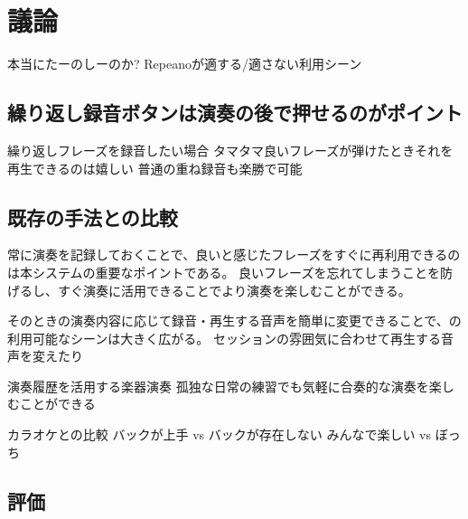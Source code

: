 \section{議論}

本当にたーのしーのか?
Repeanoが適する/適さない利用シーン

\subsection{繰り返し録音ボタンは演奏の後で押せるのがポイント}
繰り返しフレーズを録音したい場合
タマタマ良いフレーズが弾けたときそれを再生できるのは嬉しい
普通の重ね録音も楽勝で可能

\subsection{既存の手法との比較}






常に演奏を記録しておくことで、良いと感じたフレーズをすぐに再利用できるのは本システムの重要なポイントである。
良いフレーズを忘れてしまうことを防げるし、すぐ演奏に活用できることでより演奏を楽しむことができる。

そのときの演奏内容に応じて録音・再生する音声を簡単に変更できることで、{\system}の利用可能なシーンは大きく広がる。
セッションの雰囲気に合わせて再生する音声を変えたり

演奏履歴を活用する楽器演奏
孤独な日常の練習でも気軽に合奏的な演奏を楽しむことができる

カラオケとの比較
バックが上手 vs バックが存在しない
みんなで楽しい vs ぼっち

\subsection{評価}

